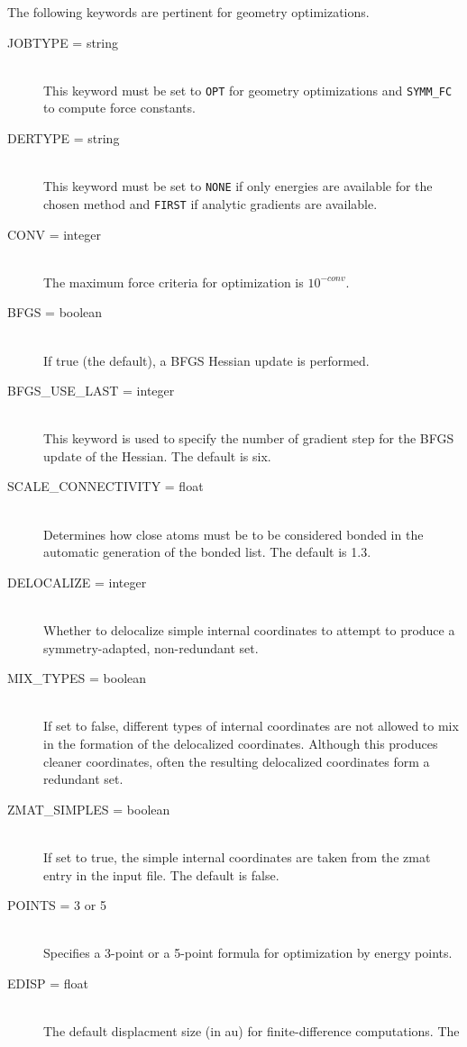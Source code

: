 The following keywords are pertinent for geometry optimizations.
\begin{description}
\item[JOBTYPE = string]\mbox{}\\
This keyword must be set to {\tt OPT} for geometry optimizations and
{\tt SYMM\_FC} to compute force constants.
\item[DERTYPE = string]\mbox{}\\
This keyword must be set to {\tt NONE} if only energies are available
for the chosen method and {\tt FIRST} if analytic gradients are available.
\item[CONV = integer]\mbox{}\\
The maximum force criteria for optimization is $10^{-conv}$.
\item[BFGS = boolean]\mbox{}\\
If true (the default), a BFGS Hessian update is performed.
\item[BFGS\_USE\_LAST = integer]\mbox{}\\
This keyword is used to specify the number of gradient step for the BFGS
update of the Hessian.  The default is six.  
\item[SCALE\_CONNECTIVITY = float]\mbox{}\\
Determines how close atoms must be to be considered bonded in the automatic
generation of the bonded list.  The default is 1.3.
\item[DELOCALIZE = integer]\mbox{}\\
Whether to delocalize simple internal coordinates to attempt to produce
a symmetry-adapted, non-redundant set.
\item[MIX\_TYPES = boolean]\mbox{}\\
If set to false, different types of internal coordinates are not allowed
to mix in the formation of the delocalized coordinates.  Although this
produces cleaner coordinates, often the resulting delocalized coordinates
form a redundant set.
\item[ZMAT\_SIMPLES = boolean]\mbox{}\\
If set to true, the simple internal coordinates are taken from the zmat
entry in the input file.  The default is false.
\item[POINTS = 3 or 5]\mbox{}\\
Specifies a 3-point or a 5-point formula for optimization by energy points.
\item[EDISP = float]\mbox{}\\
The default displacment size (in au) for finite-difference computations.  The

\end{description}
